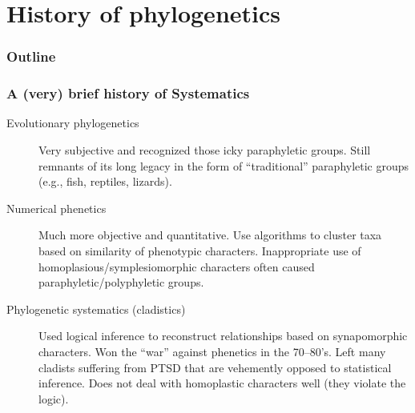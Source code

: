 \section{History of phylogenetics}

\begin{frame}
\frametitle{Outline}
\tableofcontents[currentsection]
\end{frame}
        
\begin{frame}
    \frametitle{A (very) brief history of Systematics} 
    \begin{description}
        \item[Evolutionary phylogenetics] Very subjective and recognized those
            icky paraphyletic groups. Still remnants of its long legacy in the
            form of ``traditional'' paraphyletic groups (e.g., fish, reptiles,
            lizards).
        \item[Numerical phenetics] Much more objective and quantitative.  Use
            algorithms to cluster taxa based on similarity of phenotypic
            characters. Inappropriate use of homoplasious/symplesiomorphic
            characters often caused paraphyletic/polyphyletic groups.
        \item[Phylogenetic systematics (cladistics)]
            Used logical inference to reconstruct relationships based on
            synapomorphic characters. Won the ``war'' against phenetics in the
            70--80's. Left many cladists suffering from PTSD that are
            vehemently opposed to statistical inference.
            Does not deal with homoplastic characters well (they violate the
            logic).
    \end{description}
\end{frame}

